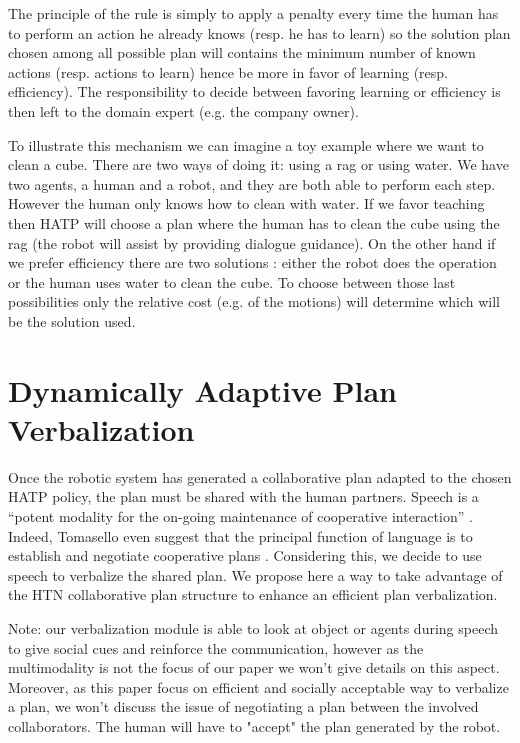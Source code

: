 \documentclass{llncs}
\begin{document}
The principle of the rule is simply to apply a penalty every time the human has to perform an action he already knows (resp. he has to learn) so the solution plan chosen among all possible plan will contains the minimum number of known actions (resp. actions to learn) hence be more in favor of learning (resp. efficiency). The responsibility to decide between favoring learning or efficiency is then left to the domain expert (e.g. the company owner).

To illustrate this mechanism we can imagine a toy example where we want to clean a cube. There are two ways of doing it: using a rag or using water. We have two agents, a human and a robot, and they are both able to perform each step. However the human only knows how to clean with water. If we favor teaching then HATP will choose a plan where the human has to clean the cube using the rag (the robot will assist by providing dialogue guidance). On the other hand if we prefer efficiency there are two solutions : either the robot does the operation or the human uses water to clean the cube. 
To choose between those last possibilities only the relative cost (e.g. of the motions) will determine which will be the solution used.



\section{Dynamically Adaptive Plan Verbalization}
\label{planVerbalization}

Once the robotic system has generated a collaborative plan adapted to the chosen HATP policy, the plan must be shared with the human partners.
Speech is a ``potent modality for the on-going maintenance of cooperative interaction'' \cite{Lallee2013}. Indeed, Tomasello even suggest that the principal function of language is to establish and negotiate cooperative plans \cite{tomasello2005}.
Considering this, we decide to use speech to verbalize the shared plan. We propose here a way to take advantage of the HTN collaborative plan structure to enhance an efficient plan verbalization.

Note: our verbalization module is able to look at object or agents during speech to give social cues and reinforce the communication, however as the multimodality is not the focus of our paper we won't give details on this aspect. Moreover, as this paper focus on efficient and socially acceptable way to verbalize a plan, we won't discuss the issue of negotiating a plan between the involved collaborators. The human will have to "accept" the plan generated by the robot.
\end{document}
